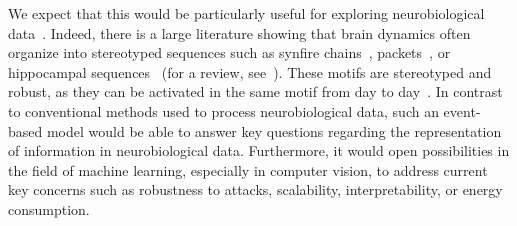 \documentclass[runningheads]{llncs}
\begin{document}
We expect that this would be particularly useful for exploring neurobiological data~\cite{mackevicius_unsupervised_2019}. Indeed, there is a large literature showing that brain dynamics often organize into stereotyped sequences such as synfire chains~\cite{ikegaya_synfire_2004}, packets~\cite{luczak_sequential_2007}, or hippocampal sequences~\cite{pastalkova_internally_2008,villette_internally_2015} (for a review, see~\cite{grimaldi_precise_2023}). These motifs are stereotyped and robust, as they can be activated in the same motif from day to day~\cite{haimerl_internal_2019}. In contrast to conventional methods used to process neurobiological data, such an event-based model would be able to answer key questions regarding the representation of information in neurobiological data. Furthermore, it would open possibilities in the field of machine learning, especially in computer vision, to address current key concerns such as robustness to attacks, scalability, interpretability, or energy consumption.
\end{document}
